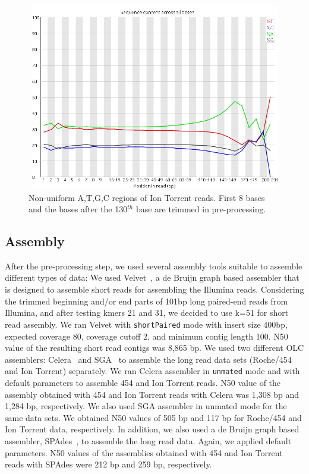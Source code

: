 \documentclass{llncs}
\begin{document}
\begin{figure}[h!tbp]
\centerline{\includegraphics[width=12cm, height=8.2cm]{ionTorrentFastqc.png}}
\caption{Non-uniform A,T,G,C regions of Ion Torrent reads. First 8 bases and the bases after the 130$^{th}$ base are trimmed in pre-processing.}
\label{fig:nonuniformATGC}
\end{figure}


\subsection{Assembly}
\label{ass} 
After the pre-processing step, we used several assembly tools suitable to assemble different types of data: We used Velvet~\cite{velvetZerbino:2008}, a de Bruijn graph based assembler that is designed to assemble short reads for assembling the Illumina reads. Considering the trimmed beginning and/or end parts of 101bp long paired-end reads from Illumina, and after testing kmers 21 and 31, we decided to use k=51 for short read assembly. We ran Velvet with {\tt shortPaired} mode with insert size 400bp, expected coverage 80, coverage cutoff 2, and minimum contig length 100. N50 value of the resulting short read contigs was 8,865 bp. We used two different OLC assemblers: Celera~\cite{celera:2000} and SGA~\cite{sga:2012} to assemble the long read data sets (Roche/454 and Ion Torrent) separately. We ran Celera assembler in {\tt unmated} mode and with default parameters to assemble 454 and Ion Torrent reads. N50 value of the assembly obtained with 454 and Ion Torrent reads with Celera was 1,308 bp and 1,284 bp, respectively. We also used SGA assembler in unmated mode for the same data sets. We obtained N50 values of 505 bp and 117 bp for Roche/454 and Ion Torrent data, respectively. In addition, we also used a de Bruijn graph based assembler, SPAdes~\cite{spadesBankevich:2012}, to assemble the long read data. Again, we applied default parameters. 
N50 values of the assemblies obtained with 454 and Ion Torrent reads with SPAdes were 212 bp and 259 bp, respectively.
\end{document}
